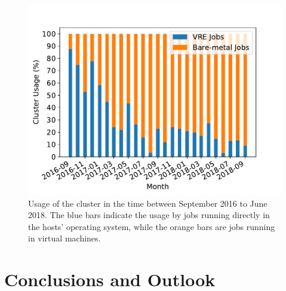 

\begin{figure}
\begin{center}
  \includegraphics[width=\linewidth]{figures/NodeUsage_2016-09_2018-09.pdf}
  \caption{Usage of the \NEMO cluster in the time between September 2016
    to June 2018. The blue bars indicate the usage by jobs
    running directly in the hosts' operating system, while the orange bars are jobs
    running in virtual machines.}
  \label{fig-nodeusage}
\end{center}
\end{figure}

\section{Conclusions and Outlook}


%
















